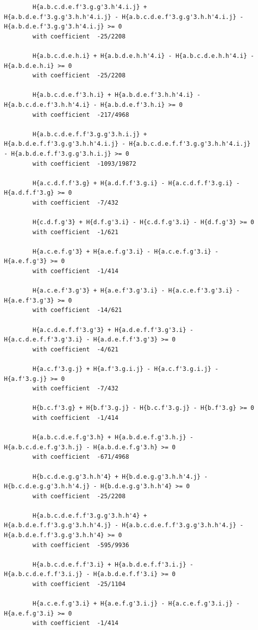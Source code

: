 \documentclass[11pt, a4paper]{kybernetika}
\begin{document}
\begin{verbatim}
		H{a.b.c.d.e.f'3.g.g'3.h'4.i.j} + H{a.b.d.e.f'3.g.g'3.h.h'4.i.j} - H{a.b.c.d.e.f'3.g.g'3.h.h'4.i.j} - H{a.b.d.e.f'3.g.g'3.h'4.i.j} >= 0
		with coefficient  -25/2208
		
		H{a.b.c.d.e.h.i} + H{a.b.d.e.h.h'4.i} - H{a.b.c.d.e.h.h'4.i} - H{a.b.d.e.h.i} >= 0
		with coefficient  -25/2208
		
		H{a.b.c.d.e.f'3.h.i} + H{a.b.d.e.f'3.h.h'4.i} - H{a.b.c.d.e.f'3.h.h'4.i} - H{a.b.d.e.f'3.h.i} >= 0
		with coefficient  -217/4968
		
		H{a.b.c.d.e.f.f'3.g.g'3.h.i.j} + H{a.b.d.e.f.f'3.g.g'3.h.h'4.i.j} - H{a.b.c.d.e.f.f'3.g.g'3.h.h'4.i.j} - H{a.b.d.e.f.f'3.g.g'3.h.i.j} >= 0
		with coefficient  -1093/19872
		
		H{a.c.d.f.f'3.g} + H{a.d.f.f'3.g.i} - H{a.c.d.f.f'3.g.i} - H{a.d.f.f'3.g} >= 0
		with coefficient  -7/432
		
		H{c.d.f.g'3} + H{d.f.g'3.i} - H{c.d.f.g'3.i} - H{d.f.g'3} >= 0
		with coefficient  -1/621
		
		H{a.c.e.f.g'3} + H{a.e.f.g'3.i} - H{a.c.e.f.g'3.i} - H{a.e.f.g'3} >= 0
		with coefficient  -1/414
		
		H{a.c.e.f'3.g'3} + H{a.e.f'3.g'3.i} - H{a.c.e.f'3.g'3.i} - H{a.e.f'3.g'3} >= 0
		with coefficient  -14/621
		
		H{a.c.d.e.f.f'3.g'3} + H{a.d.e.f.f'3.g'3.i} - H{a.c.d.e.f.f'3.g'3.i} - H{a.d.e.f.f'3.g'3} >= 0
		with coefficient  -4/621
		
		H{a.c.f'3.g.j} + H{a.f'3.g.i.j} - H{a.c.f'3.g.i.j} - H{a.f'3.g.j} >= 0
		with coefficient  -7/432
		
		H{b.c.f'3.g} + H{b.f'3.g.j} - H{b.c.f'3.g.j} - H{b.f'3.g} >= 0
		with coefficient  -1/414
		
		H{a.b.c.d.e.f.g'3.h} + H{a.b.d.e.f.g'3.h.j} - H{a.b.c.d.e.f.g'3.h.j} - H{a.b.d.e.f.g'3.h} >= 0
		with coefficient  -671/4968
		
		H{b.c.d.e.g.g'3.h.h'4} + H{b.d.e.g.g'3.h.h'4.j} - H{b.c.d.e.g.g'3.h.h'4.j} - H{b.d.e.g.g'3.h.h'4} >= 0
		with coefficient  -25/2208
		
		H{a.b.c.d.e.f.f'3.g.g'3.h.h'4} + H{a.b.d.e.f.f'3.g.g'3.h.h'4.j} - H{a.b.c.d.e.f.f'3.g.g'3.h.h'4.j} - H{a.b.d.e.f.f'3.g.g'3.h.h'4} >= 0
		with coefficient  -595/9936
		
		H{a.b.c.d.e.f.f'3.i} + H{a.b.d.e.f.f'3.i.j} - H{a.b.c.d.e.f.f'3.i.j} - H{a.b.d.e.f.f'3.i} >= 0
		with coefficient  -25/1104
		
		H{a.c.e.f.g'3.i} + H{a.e.f.g'3.i.j} - H{a.c.e.f.g'3.i.j} - H{a.e.f.g'3.i} >= 0
		with coefficient  -1/414
		

\end{verbatim}
\end{document}
